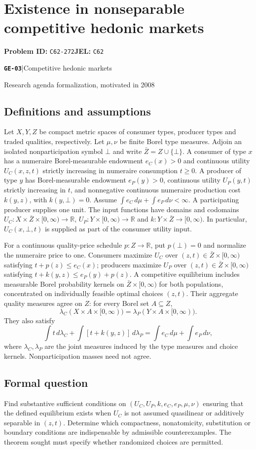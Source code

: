\documentclass[11pt,a4paper]{article}
\newcommand{\R}{\mathbb R}
\newcommand{\entrymeta}[3]{{\sffamily\small\color{muted}\textbf{\texttt{#1}}\quad|\quad #2\par #3\par}}
\begin{document}
\section*{Existence in nonseparable competitive hedonic markets}
\textbf{Problem ID:} \texttt{C62-272}\quad \textbf{JEL:} \texttt{C62}\par
\label{problem:OP-0575}
\label{beyond:GE-03}
\entrymeta{GE-03}{Competitive hedonic markets}{Research agenda formalization, motivated in 2008}
\subsection*{Definitions and assumptions}
Let $X,Y,Z$ be compact metric spaces of consumer types, producer types and traded qualities, respectively. Let $\mu,\nu$ be finite Borel type measures. Adjoin an isolated nonparticipation symbol $\bot$ and write $\bar Z=Z\cup\{\bot\}$. A consumer of type $x$ has a numeraire Borel-measurable endowment $e_C(x)>0$ and continuous utility $U_C(x,z,t)$ strictly increasing in numeraire consumption $t\ge0$. A producer of type $y$ has Borel-measurable endowment $e_P(y)>0$, continuous utility $U_P(y,t)$ strictly increasing in $t$, and nonnegative continuous numeraire production cost $k(y,z)$, with $k(y,\bot)=0$. Assume $\int e_C\,d\mu+\int e_P\,d\nu<\infty$. A participating producer supplies one unit. The input functions have domains and codomains $U_C:X\times\bar Z\times[0,\infty)\to\R$, $U_P:Y\times[0,\infty)\to\R$ and $k:Y\times\bar Z\to[0,\infty)$. In particular, $U_C(x,\bot,t)$ is supplied as part of the consumer utility input.

For a continuous quality-price schedule $p:Z\to\R$, put $p(\bot)=0$ and normalize the numeraire price to one. Consumers maximize $U_C$ over $(z,t)\in\bar Z\times[0,\infty)$ satisfying $t+p(z)\le e_C(x)$; producers maximize $U_P$ over $(z,t)\in\bar Z\times[0,\infty)$ satisfying $t+k(y,z)\le e_P(y)+p(z)$. A competitive equilibrium includes measurable Borel probability kernels on $\bar Z\times[0,\infty)$ for both populations, concentrated on individually feasible optimal choices $(z,t)$. Their aggregate quality measures agree on $Z$: for every Borel set $A\subseteq Z$,
\[
 \lambda_C(X\times A\times[0,\infty))
 =\lambda_P(Y\times A\times[0,\infty)).
\]
They also satisfy
\[
 \int t\,d\lambda_C+\int[t+k(y,z)]\,d\lambda_P
 =\int e_C\,d\mu+\int e_P\,d\nu,
\]
where $\lambda_C,\lambda_P$ are the joint measures induced by the type measures and choice kernels. Nonparticipation masses need not agree.
\subsection*{Formal question}
Find substantive sufficient conditions on $(U_C,U_P,k,e_C,e_P,\mu,\nu)$ ensuring that the defined equilibrium exists when $U_C$ is not assumed quasilinear or additively separable in $(z,t)$. Determine which compactness, nonatomicity, substitution or boundary conditions are indispensable by admissible counterexamples. The theorem sought must specify whether randomized choices are permitted.
\end{document}
